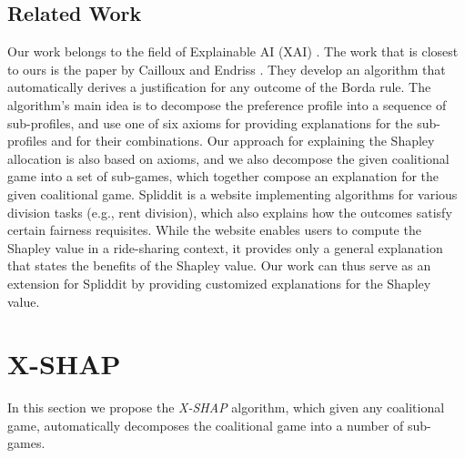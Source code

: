 \documentclass[letterpaper]{article}
\begin{document}
\subsection{Related Work}
Our work belongs to the field of Explainable AI (XAI) \cite{gunning2019xai}. %
The work that is closest to ours is the paper by Cailloux and Endriss \cite{Cailloux2016ArguingAV}.
They %
develop an algorithm that automatically derives a justification for any outcome of the Borda rule. The algorithm's main idea is to decompose the preference profile into a sequence of sub-profiles, and use one of six axioms for providing explanations for the sub-profiles and for their combinations. %
Our approach for explaining the Shapley allocation is also based on axioms, and we also decompose the given coalitional game into a set of sub-games, which together compose an explanation for the given coalitional game.  Spliddit \cite{Goldman14spliddit:unleashing} is a website implementing algorithms for various division tasks (e.g., rent division), which also explains how the outcomes satisfy certain fairness requisites.
While the website enables users to compute the Shapley value in a ride-sharing context, it provides only a general explanation that states the benefits of the Shapley value.
Our work can thus serve as an extension for Spliddit by providing customized explanations for the Shapley value.






\vspace{-0.84mm}
\section{X-SHAP}
In this section we propose the \textit{X-SHAP} algorithm, %
which given any coalitional game, automatically decomposes the coalitional game into a number of sub-games. %
\end{document}
